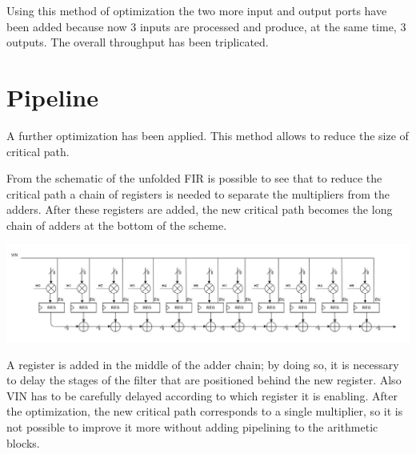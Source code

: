 Using this method of optimization the two more input and output ports have been added because
now 3 inputs are processed and produce, at the same time, 3 outputs. The overall throughput has
been triplicated.


\section{Pipeline}

A further optimization has been applied. This method allows to reduce the size of critical path.

From the schematic of the unfolded FIR is possible to see that to reduce the critical path a chain of registers
is needed to separate the multipliers from the adders. After these registers are added, the new critical path 
becomes the long chain of adders at the bottom of the scheme.

\centerline{
\includegraphics[width=15.5cm]{./chapters/figures/fir_adv_1.jpg}}

\vspace{5mm}

A register is added in the middle of the adder chain; by doing so, it is necessary to delay the stages of the filter
that are positioned behind the new register. Also VIN has to be carefully delayed according to which register it is enabling.
After the optimization, the new critical path corresponds to a single multiplier, so it is not possible to improve it more
without adding pipelining to the arithmetic blocks.

